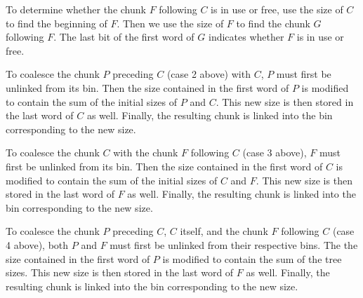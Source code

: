 To determine whether the chunk $F$ following $C$ is in use or free,
use the size of $C$ to find the beginning of $F$.  Then we use the
size of $F$ to find the chunk $G$ following $F$.  The last bit of the
first word of $G$ indicates whether $F$ is in use or free.

To coalesce the chunk $P$ preceding $C$ (case 2 above) with $C$, $P$
must first be unlinked from its bin.  Then the size contained in the
first word of $P$ is modified to contain the sum of the initial sizes
of $P$ and $C$.  This new size is then stored in the last word of $C$
as well.  Finally, the resulting chunk is linked into the bin
corresponding to the new size.

To coalesce the chunk $C$ with the chunk $F$ following $C$ (case 3
above), $F$ must first be unlinked from its bin.  Then the size
contained in the first word of $C$ is modified to contain the sum of
the initial sizes of $C$ and $F$.  This new size is then stored in the
last word of $F$ as well.  Finally, the resulting chunk is linked into
the bin corresponding to the new size.

To coalesce the chunk $P$ preceding $C$, $C$ itself, and the chunk $F$
following $C$ (case 4 above), both $P$ and $F$ must first be unlinked
from their respective bins.  The the size contained in the first word
of $P$ is modified to contain the sum of the tree sizes.  This new
size is then stored in the last word of $F$ as well.  Finally, the
resulting chunk is linked into the bin corresponding to the new size.
